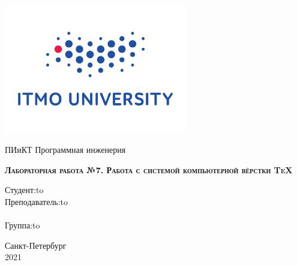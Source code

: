 \thispagestyle{empty}

\begin{center}
\includegraphics[width=8cm]{pictures/itmo}
\end{center}

\vspace{8em}

\begin{center}
\Large ПИиКТ Программная инженерия \\ 
\end{center}

\vspace{1em}

\begin{center}
\large{
\textsc{\textbf{Лабораторная работа №7. \linebreak Работа с системой компьютерной вёрстки \TeX{}}}
}
\end{center}

\vspace{15em}


\newbox{\lbox}
\newlength{\maxl}
\setlength{\maxl}{\wd\lbox}
\hfill\parbox{11cm}{
\hspace*{5cm}\hspace*{-5cm}Студент:\hfill\hbox to\\
\hspace*{5cm}\hspace*{-5cm}Преподаватель:\hfill\hbox to\\
\\
\hspace*{5cm}\hspace*{-5cm}Группа:\hfill\hbox to\\
}


\vspace{\fill}

\begin{center}
Санкт-Петербург \\2021
\end{center}
\newpage